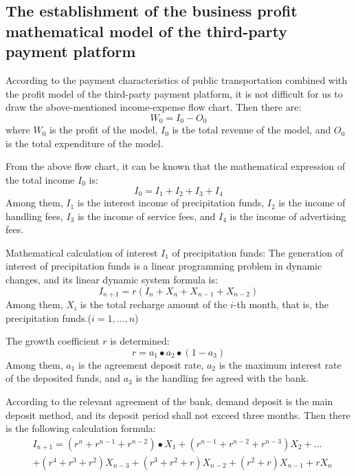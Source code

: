 \documentclass[../mcmpaper]{subfiles}
\begin{document}
\subsection{The establishment of the business profit mathematical model of the third-party payment platform}
According to the payment characteristics of public transportation combined with the profit model of the third-party payment platform, it is not difficult for us to draw the above-mentioned income-expense flow chart. Then there are:
\begin{equation}
W_0 = I_0 - O_0
\end{equation}
where $W_0$ is the profit of the model, $I_0$ is the total revenue of the model, and $O_0$ is the total expenditure of the model.
\par
From the above flow chart, it can be known that the mathematical expression of the total income $I_0$ is:
\begin{equation}
I_0 = I_1 + I_2 + I_3 + I_4
\end{equation}
Among them, $I_1$ is the interest income of precipitation funds, $I_2$ is the income of handling fees, $I_3$ is the income of service fees, and $I_4$ is the income of advertising fees.
\par
Mathematical calculation of interest $I_1$ of precipitation funds: The generation of interest of precipitation funds is a linear programming problem in dynamic changes, and its linear dynamic system formula is:
\begin{equation}
I_{n+1} = r(I_n+X_n+X_{n-1}+X_{n-2})
\end{equation}
Among them, $X_i$ is the total recharge amount of the $i$-th month, that is, the precipitation funds.($i=1,\dots,n$)
\par
The growth coefficient $r$ is determined:
\begin{equation}
r = a_1\bullet a_2\bullet(1-a_3)
\end{equation}
Among them, $a_1$ is the agreement deposit rate, $a_2$ is the maximum interest rate of the deposited funds, and $a_3$ is the handling fee agreed with the bank.
\par
According to the relevant agreement of the bank, demand deposit is the main deposit method, and its deposit period shall not exceed three months. Then there is the following calculation formula:
\begin{equation}
\begin{aligned}
&I_{n+1}=\left(r^{n}+r^{n-1}+r^{n-2}\right) \bullet X_{1}+\left(r^{n-1}+r^{n-2}+r^{n-3}\right) X_{2}+\dots \\
&+\left(r^{4}+r^{3}+r^{2}\right) X_{n-3}+\left(r^{3}+r^{2}+r\right) X_{n-2}+\left(r^{2}+r\right) X_{n-1}+r X_{n}
\end{aligned}
\end{equation}
\end{document}
